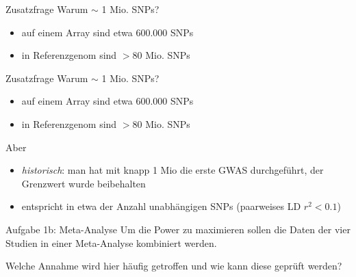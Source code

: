 \documentclass{beamer}
\begin{document}
\begin{frame}{Zusatzfrage}
    Warum $\sim$ 1 Mio. SNPs? 

    \begin{itemize}
        \item auf einem Array sind etwa 600.000 SNPs
        \item in Referenzgenom sind $>80$ Mio. SNPs
    \end{itemize}
\end{frame}

\begin{frame}{Zusatzfrage}
    Warum $\sim$ 1 Mio. SNPs? 

    \begin{itemize}
        \item auf einem Array sind etwa 600.000 SNPs
        \item in Referenzgenom sind $>80$ Mio. SNPs
    \end{itemize}
    
    Aber
    
    \begin{itemize}
        \item \textit{historisch}: man hat mit knapp 1 Mio die erste GWAS durchgeführt, der Grenzwert wurde beibehalten 
        \item entspricht in etwa der Anzahl unabhängigen SNPs (paarweises LD $r^2<0.1$)
    \end{itemize}
\end{frame}

\begin{frame}{Aufgabe 1b: Meta-Analyse}
Um die Power zu maximieren sollen die Daten der vier Studien in einer Meta-Analyse kombiniert werden. 

Welche Annahme wird hier häufig getroffen und wie kann diese geprüft werden?
    
\end{frame}
\end{document}

